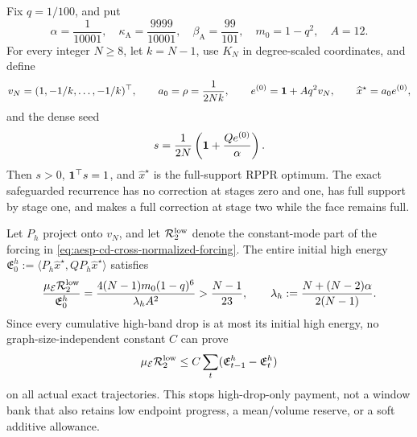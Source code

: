 \begin{proposition}
\label{prop:aesp-cd-kn-cross-bank-stop}
Fix $q=1/100$, and put
\begin{equation*}
 \alpha=\frac1{10001},\quad
 \kappa_{\mathrm A}=\frac{9999}{10001},\quad
 \beta_{\mathrm A}=\frac{99}{101},\quad
 m_0=1-q^2,\quad A=12.
\end{equation*}
For every integer $N\geq8$, let $k=N-1$, use $K_N$ in degree-scaled
coordinates, and define
\begin{equation}
 v_N=(1,-1/k,\ldots,-1/k)^\top,\qquad
 a_0=\rho=\frac1{2Nk},\qquad
 e^{(0)}=\mathbf{1}+Aq^2v_N,\qquad
 \widehat x^\star=a_0e^{(0)},
 \label{eq:aesp-cd-kn-cross-family}
\end{equation}
and the dense seed
\begin{equation}
 s=\frac1{2N}\left(\mathbf{1}+\frac{Qe^{(0)}}\alpha\right).
 \label{eq:aesp-cd-kn-cross-seed}
\end{equation}
Then $s>0$, $\mathbf{1}^\top s=1$, and $\widehat x^\star$ is the full-support RPPR
optimum.  The exact safeguarded recurrence has no correction at stages zero
and one, has full support by stage one, and makes a full correction at stage
two while the face remains full.

Let $P_h$ project onto $v_N$, and let $\mathcal R_2^{\rm low}$ denote the
constant-mode part of the forcing in
\cref{eq:aesp-cd-cross-normalized-forcing}.  The entire initial high energy
$\mathfrak E_0^h:=\langle P_h\widehat x^\star,
 QP_h\widehat x^\star\rangle$ satisfies
\begin{equation}
 \frac{\mu_{\mathcal E}\mathcal R_2^{\rm low}}
      {\mathfrak E_0^h}
 =\frac{4(N-1)m_0(1-q)^6}{\lambda_hA^2}
 >\frac{N-1}{23},
 \qquad
 \lambda_h:=\frac{N+(N-2)\alpha}{2(N-1)}.
 \label{eq:aesp-cd-kn-global-high-stop}
\end{equation}
Since every cumulative high-band drop is at most its initial high energy, no
graph-size-independent constant $C$ can prove
\begin{equation*}
 \mu_{\mathcal E}\mathcal R_2^{\rm low}
 \leq C\sum_t(\mathfrak E_{t-1}^h-\mathfrak E_t^h)
\end{equation*}
on all actual exact trajectories.  This stops high-drop-only payment, not a
window bank that also retains low endpoint progress, a mean/volume reserve,
or a soft additive allowance.


\end{proposition}
